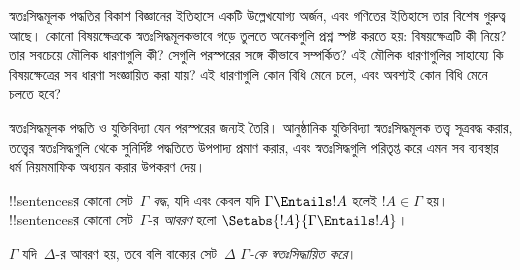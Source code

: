 \documentclass[../../../include/open-logic-section]{subfiles}
\begin{document}

\begin{explain}
স্বতঃসিদ্ধমূলক পদ্ধতির বিকাশ বিজ্ঞানের ইতিহাসে একটি উল্লেখযোগ্য অর্জন,
এবং গণিতের ইতিহাসে তার বিশেষ গুরুত্ব আছে। কোনো বিষয়ক্ষেত্রকে
স্বতঃসিদ্ধমূলকভাবে গড়ে তুলতে অনেকগুলি প্রশ্ন স্পষ্ট করতে হয়:
বিষয়ক্ষেত্রটি কী নিয়ে? তার সবচেয়ে মৌলিক ধারণাগুলি কী? সেগুলি পরস্পরের
সঙ্গে কীভাবে সম্পর্কিত? এই মৌলিক ধারণাগুলির সাহায্যে কি বিষয়ক্ষেত্রের
সব ধারণা সংজ্ঞায়িত করা যায়? এই ধারণাগুলি কোন বিধি মেনে চলে, এবং
অবশ্যই কোন বিধি মেনে চলতে হবে?

স্বতঃসিদ্ধমূলক পদ্ধতি ও যুক্তিবিদ্যা যেন পরস্পরের জন্যই তৈরি।
আনুষ্ঠানিক যুক্তিবিদ্যা স্বতঃসিদ্ধমূলক তত্ত্ব সূত্রবদ্ধ করার, তত্ত্বের
স্বতঃসিদ্ধগুলি থেকে সুনির্দিষ্ট পদ্ধতিতে উপপাদ্য প্রমাণ করার, এবং
স্বতঃসিদ্ধগুলি পরিতৃপ্ত করে এমন সব ব্যবস্থার ধর্ম নিয়মমাফিক অধ্যয়ন
করার উপকরণ দেয়।
\end{explain}

\begin{defn}
!!{sentence}sর কোনো সেট~$\Gamma$ \emph{বদ্ধ}, যদি এবং কেবল যদি
$\Gamma \Entails !A$ হলেই $!A \in \Gamma$ হয়। !!{sentence}sর
কোনো সেট~$\Gamma$-র \emph{আবরণ} হলো
$\Setabs{!A}{\Gamma \Entails !A}$।

$\Gamma$ যদি~$\Delta$-র আবরণ হয়, তবে বলি বাক্যের
সেট~$\Delta$ \emph{$\Gamma$-কে স্বতঃসিদ্ধায়িত করে}।
\end{defn}
\end{document}
